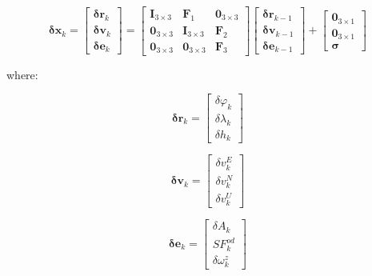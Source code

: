 \documentclass[conference]{IEEEtran}
\begin{document}
\begin{equation}
    \boldsymbol{\delta x}_k = 
    \begin{bmatrix} 
        \boldsymbol{\delta r}_k \\ 
        \boldsymbol{\delta v}_k \\ 
        \boldsymbol{\delta e}_k 
    \end{bmatrix} =
    \begin{bmatrix} 
        \mathbf{I}_{3\times3} & \mathbf{F}_1 & \mathbf{0}_{3\times3} \\ 
        \mathbf{0}_{3\times3} & \mathbf{I}_{3\times3} & \mathbf{F}_2 \\ 
        \mathbf{0}_{3\times3} & \mathbf{0}_{3\times3} & \mathbf{F}_3 
    \end{bmatrix}
    \begin{bmatrix} 
        \boldsymbol{\delta r}_{k-1} \\ 
        \boldsymbol{\delta v}_{k-1} \\ 
        \boldsymbol{\delta e}_{k-1} 
    \end{bmatrix}
    + 
    \begin{bmatrix} 
        \mathbf{0}_{3\times1} \\ 
        \mathbf{0}_{3\times1} \\ 
        \boldsymbol{\sigma} 
    \end{bmatrix}
    \label{eq:error_state_system}
\end{equation}

where:

\begin{equation}
    \boldsymbol{\delta r}_k =
    \begin{bmatrix} 
        \delta \varphi_k \\ 
        \delta \lambda_k \\ 
        \delta h_k 
    \end{bmatrix}
\end{equation}

\begin{equation}
    \boldsymbol{\delta v}_k =
    \begin{bmatrix} 
        \delta v_k^E \\ 
        \delta v_k^N \\ 
        \delta v_k^U 
    \end{bmatrix}
\end{equation}

\begin{equation}
    \boldsymbol{\delta e}_k =
    \begin{bmatrix} 
        \delta A_k \\ 
        SF_k^{od} \\ 
        \delta \omega_k^z 
    \end{bmatrix}
\end{equation}
\end{document}
